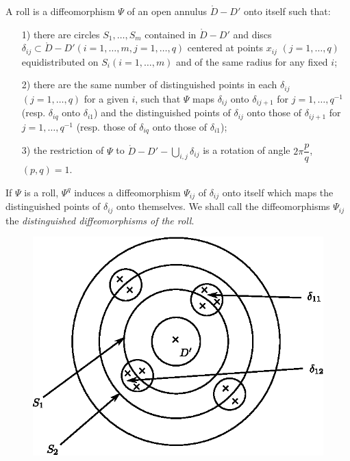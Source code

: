 \begin{definition}\label{art15-def2.9}
A roll is a diffeomorphism $\Psi$ of an open annulus $\mathring{D} - D'$ onto itself such that:
\begin{itemize}
\item[1)] there are circles $S_1, \ldots,S_m$ contained in $\mathring{D} - D'$ and discs $\delta_{ij} \subset \mathring{D} - D' (i=1,\ldots, m, j = 1, \ldots, q)$ centered at points $x_{ij}$ $(j = 1, \ldots,q)$ equidistributed on $S_i (i =1,\ldots, m)$ and of the same radius for any fixed $i$;

\item[2)] there are the same number of distinguished points in each $\delta_{ij}$ $(j=1,\ldots, q)$ for a given $i$, such that $\Psi$ maps $\delta_{ij}$ onto $\delta_{ij+1}$ for $j=1, \ldots, q^{-1}$ (resp. $\delta_{iq}$ onto $\delta_{i1}$) and the distinguished points of $\delta_{ij}$ onto those of $\delta_{ij+1}$ for $j = 1, \ldots, q^{-1}$ (resp. those of $\delta_{iq}$ onto those of $\delta_{i1}$);

\item[3)] the restriction of $\Psi$ to $\mathring{D} - D' - \bigcup\limits_{i,j} \delta_{ij}$ is a rotation of angle $2\pi \dfrac{p}{q}$, $(p,q) =1$.
\end{itemize}
\end{definition}

If $\Psi$ is a roll, $\Psi^q$ induces a diffeomorphism $\Psi_{ij}$ of $\delta_{ij}$ onto itself which maps the distinguished points of $\delta_{ij}$ onto themselves. We shall call the diffeomorphisms $\Psi_{ij}$ the {\em distinguished diffeomorphisms of the roll}.
\begin{figure}[H]
\centering
\includegraphics{fig15-1.eps}
\end{figure}\pageoriginale


